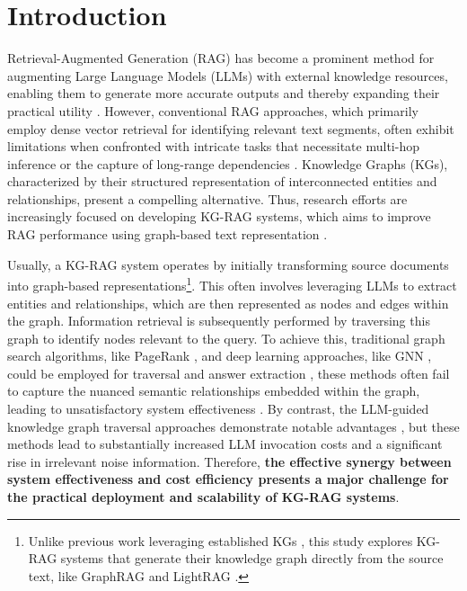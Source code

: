 \section{Introduction}
\label{sec:intro}

Retrieval-Augmented Generation (RAG) \cite{Base2} has become a prominent method for augmenting Large Language Models (LLMs) with external knowledge resources, enabling them to generate more accurate outputs and thereby expanding their practical utility \cite{Hallucination1,Hallucination2}. However, conventional RAG approaches, which primarily employ dense vector retrieval \cite{Base1,Base3,Base4} for identifying relevant text segments, often exhibit limitations when confronted with intricate tasks that necessitate multi-hop inference \cite{Benchmark2} or the capture of long-range dependencies \cite{Benchmark1}. Knowledge Graphs (KGs), characterized by their structured representation of interconnected entities and relationships, present a compelling alternative. Thus, research efforts are increasingly focused on developing KG-RAG systems, which aims to improve RAG performance using graph-based text representation \cite{KG4,KG7,KG9}.

Usually, a KG-RAG system operates by initially transforming source documents into graph-based representations\footnote{Unlike previous work leveraging established KGs \cite{KG1,KG2,LLM-Traverse7,KGQA1}, this study explores KG-RAG systems that generate their knowledge graph directly from the source text, like GraphRAG \cite{Main3} and LightRAG \cite{Main2}.}. This often involves leveraging LLMs to extract entities and relationships, which are then represented as nodes and edges within the graph. Information retrieval is subsequently performed by traversing this graph to identify nodes relevant to the query. To achieve this, traditional graph search algorithms, like PageRank \cite{PPR,Main3}, and deep learning approaches, like GNN \cite{GNN1}, could be employed for traversal and answer extraction \cite{Main5,KG3,Main9,Cot5}, these methods often fail to capture the nuanced semantic relationships embedded within the graph, leading to unsatisfactory system effectiveness \cite{Main6,KG4,LLM-Traverse5}. By contrast, the LLM-guided knowledge graph traversal approaches demonstrate notable advantages \cite{KG1,KG2,KG5}, but these methods lead to substantially increased LLM invocation costs and a significant rise in irrelevant noise information. Therefore, \textbf{the effective synergy between system effectiveness and cost efficiency presents a major challenge for the practical deployment and scalability of KG-RAG systems}.


